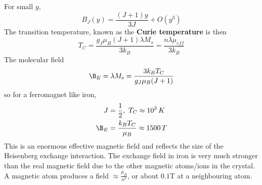 \documentclass[a4paper, 11pt, normalem]{report}
\begin{document}
For small $y$,
\begin{equation}
    B_J(y) = \frac{(J+1)y}{3J} + O(y^3)
\end{equation}
The transition temperature, known as the \textbf{Curie temperature} is then
\begin{equation}
    T_C = \frac{g_J\mu_B(J+1)\lambda M_s}{3k_B} = \frac{n\lambda\mu_{eff}}{3k_B}
\end{equation}
The molecular field
\begin{equation}
    \B_E = \lambda M_s = \frac{3k_BT_C}{g_J\mu_B(J+1)}
\end{equation}
so for a ferromagnet like iron, 
\begin{align}
    J &= \frac12,~ T_C \approx 10^3\,K \\
    \B_E &= \frac{k_BT_C}{\mu_B} \approx 1500\,T
\end{align}
This is an enormous effective magnetic field and reflects the size of the Heisenberg exchange interaction.
The exchange field in iron is very much stronger than the real magnetic field due to the other magnetic atoms/ions in the crystal. 
A magnetic atom produces a field $\approx \frac{\mu_B}{a^3}$, or about $0.1$T at a neighbouring atom.

\chapter{}
\end{document}
